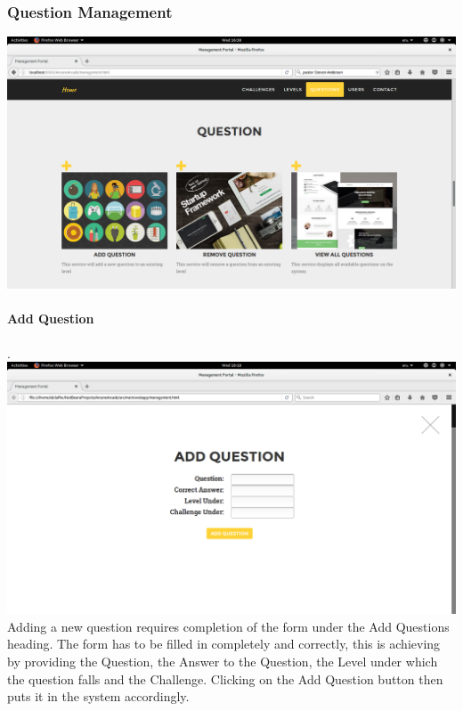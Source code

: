 \documentclass[english]{article}
\begin{document}
				
			
			
			\subsubsection{Question Management}
				\includegraphics[width=\linewidth]{Question.png}				\newline

					\paragraph{Add Question}. \\ \newline			
				\includegraphics[width=\linewidth]{AddQuestion.png}				\newline
Adding a new question requires completion of the form under the Add Questions heading. The form has to be filled in completely and correctly, this is achieving by providing the Question, the Answer to the Question, the Level under which the question falls and the Challenge. Clicking on the Add Question button then puts it in the system accordingly.
				\\[12pt]\newline
\end{document}
